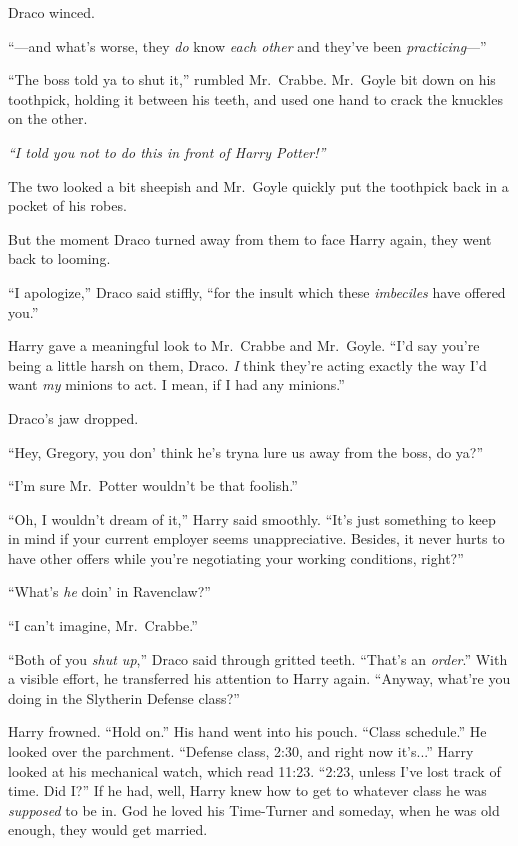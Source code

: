 Draco winced.

“—and what’s worse, they \emph{do} know \emph{each other} and they’ve been \emph{practicing}—”

“The boss told ya to shut it,” rumbled Mr.~Crabbe. Mr.~Goyle bit down on his toothpick, holding it between his teeth, and used one hand to crack the knuckles on the other.

\emph{“I told you not to do this in front of Harry Potter!”}

The two looked a bit sheepish and Mr.~Goyle quickly put the toothpick back in a pocket of his robes.

But the moment Draco turned away from them to face Harry again, they went back to looming.

“I apologize,” Draco said stiffly, “for the insult which these \emph{imbeciles} have offered you.”

Harry gave a meaningful look to Mr.~Crabbe and Mr.~Goyle. “I’d say you’re being a little harsh on them, Draco. \emph{I} think they’re acting exactly the way I’d want \emph{my} minions to act. I mean, if I had any minions.”

Draco’s jaw dropped.

“Hey, Gregory, you don’ think he’s tryna lure us away from the boss, do ya?”

“I’m sure Mr.~Potter wouldn’t be that foolish.”

“Oh, I wouldn’t dream of it,” Harry said smoothly. “It’s just something to keep in mind if your current employer seems unappreciative. Besides, it never hurts to have other offers while you’re negotiating your working conditions, right?”

“What’s \emph{he} doin’ in Ravenclaw?”

“I can’t imagine, Mr.~Crabbe.”

“Both of you \emph{shut up},” Draco said through gritted teeth. “That’s an \emph{order}.” With a visible effort, he transferred his attention to Harry again. “Anyway, what’re you doing in the Slytherin Defense class?”

Harry frowned. “Hold on.” His hand went into his pouch. “Class schedule.” He looked over the parchment. “Defense class, 2:30, and right now it’s...” Harry looked at his mechanical watch, which read 11:23. “2:23, unless I’ve lost track of time. Did I?” If he had, well, Harry knew how to get to whatever class he was \emph{supposed} to be in. God he loved his Time-Turner and someday, when he was old enough, they would get married.

